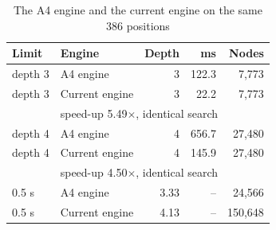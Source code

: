 \begin{table}[!htbp]
\centering\caption{The A4 engine and the current engine on the same 386 positions}\label{tab:speed}
\footnotesize
\begin{tabular}{@{}llrrr@{}}
\toprule
Limit & Engine & Depth & ms & Nodes \\
\midrule
depth 3 & A4 engine & 3 & 122.3 & 7,773 \\
depth 3 & Current engine & 3 & 22.2 & 7,773 \\
& \multicolumn{4}{l}{speed-up 5.49$\times$, identical search} \\
\midrule
depth 4 & A4 engine & 4 & 656.7 & 27,480 \\
depth 4 & Current engine & 4 & 145.9 & 27,480 \\
& \multicolumn{4}{l}{speed-up 4.50$\times$, identical search} \\
\midrule
0.5 s & A4 engine & 3.33 & -- & 24,566 \\
0.5 s & Current engine & 4.13 & -- & 150,648 \\
\bottomrule
\end{tabular}
\par\vspace{2pt}{\scriptsize Means per position. Identical search: the same move, value and node count on every position. 0.5 s: mean completed depth and nodes per move; positions per completed depth: A4 engine 1: 3, 2: 4, 3: 241, 4: 138; Current engine 1: 3, 2: 1, 3: 1, 4: 318, 5: 63. One process, one position at a time, pinned to logical CPU 2, high priority, power throttling off; Python 3.14.6.}
\end{table}
